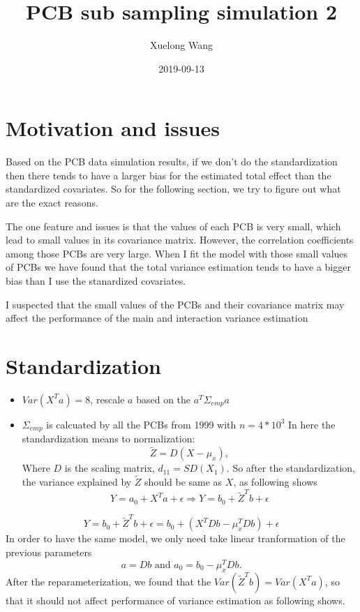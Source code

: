 \documentclass[]{article}
\title{PCB sub sampling simulation 2}
\author{Xuelong Wang}
\date{2019-09-13}
\providecommand{\tightlist}{%
  \setlength{\itemsep}{0pt}\setlength{\parskip}{0pt}}
\begin{document}
\maketitle

{
\setcounter{tocdepth}{2}
\tableofcontents
}
\section{Motivation and issues}\label{motivation-and-issues}

Based on the PCB data simulation results, if we don't do the
standardization then there tends to have a larger bias for the estimated
total effect than the standardized covariates. So for the following
section, we try to figure out what are the exact reasons.

The one feature and issues is that the values of each PCB is very small,
which lead to small values in its covariance matrix. However, the
correlation coefficients among those PCBs are very large. When I fit the
model with those small values of PCBs we have found that the total
variance estimation tends to have a bigger bias than I use the
stanardized covariates.

I suspected that the small values of the PCBs and their covariance
matrix may affect the performance of the main and interaction variance
estimation

\section{Standardization}\label{standardization}

\begin{itemize}
\tightlist
\item
  \(Var(X^Ta) = 8\), rescale \(a\) based on the \(a^T\Sigma_{emp}a\)
\item
  \(\Sigma_{emp}\) is calcuated by all the PCBs from 1999 with
  \(n = 4*10^3\) In here the standardization means to normalization: \[
    \tilde{Z} = D(X - \mu_x), 
  \] Where \(D\) is the scaling matrix, \(d_{11} = SD(X_1)\). So after
  the standardization, the variance explained by \(\tilde{Z}\) should be
  same as \(X\), as following shows \[
  Y = a_0 + X^Ta + \epsilon \Rightarrow Y = b_0 + \tilde{Z}^Tb + \epsilon
  \]
\end{itemize}

\[
  Y = b_0 + \tilde{Z}^Tb + \epsilon = b_0 + (X^TDb - \mu_x^TDb) +\epsilon
\] In order to have the same model, we only need take linear
tranformation of the previous parameters \[
   a = Db \text{ and } a_0 = b_0 - \mu_x^TDb.
\] After the reparameterization, we found that the
\(Var(\tilde{Z}^Tb) = Var(X^Ta)\), so that it should not affect
performance of variance estimation as following shows.
\end{document}
